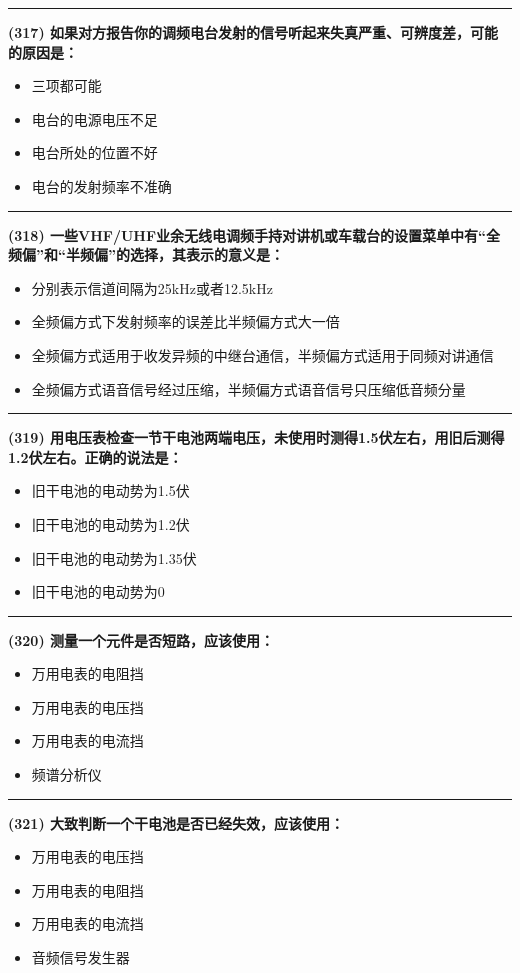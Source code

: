 \documentclass[twocolumn]{ctexart}  %
\begin{document}
\noindent\rule{0.5\textwidth}{1pt}
\heiti \textbf{(317) 如果对方报告你的调频电台发射的信号听起来失真严重、可辨度差，可能的原因是：} \songti {\color{gray} [LK1182] }
\begin{itemize}
	\item  三项都可能
	\item  电台的电源电压不足
	\item  电台所处的位置不好
	\item  电台的发射频率不准确
\end{itemize}


\noindent\rule{0.5\textwidth}{1pt}
\heiti \textbf{(318) 一些VHF/UHF业余无线电调频手持对讲机或车载台的设置菜单中有“全频偏”和“半频偏”的选择，其表示的意义是：} \songti {\color{gray} [LK1237] }
\begin{itemize}
	\item  分别表示信道间隔为25kHz或者12.5kHz
	\item  全频偏方式下发射频率的误差比半频偏方式大一倍
	\item  全频偏方式适用于收发异频的中继台通信，半频偏方式适用于同频对讲通信
	\item  全频偏方式语音信号经过压缩，半频偏方式语音信号只压缩低音频分量
\end{itemize}


\noindent\rule{0.5\textwidth}{1pt}
\heiti \textbf{(319) 用电压表检查一节干电池两端电压，未使用时测得1.5伏左右，用旧后测得1.2伏左右。正确的说法是：} \songti {\color{gray} [LK0436] }
\begin{itemize}
	\item  旧干电池的电动势为1.5伏
	\item  旧干电池的电动势为1.2伏
	\item  旧干电池的电动势为1.35伏
	\item  旧干电池的电动势为0
\end{itemize}


\noindent\rule{0.5\textwidth}{1pt}
\heiti \textbf{(320) 测量一个元件是否短路，应该使用：} \songti {\color{gray} [LK0482] }
\begin{itemize}
	\item  万用电表的电阻挡
	\item  万用电表的电压挡
	\item  万用电表的电流挡
	\item  频谱分析仪
\end{itemize}


\noindent\rule{0.5\textwidth}{1pt}
\heiti \textbf{(321) 大致判断一个干电池是否已经失效，应该使用：} \songti {\color{gray} [LK0483] }
\begin{itemize}
	\item  万用电表的电压挡
	\item  万用电表的电阻挡
	\item  万用电表的电流挡
	\item  音频信号发生器
\end{itemize}
\end{document}
